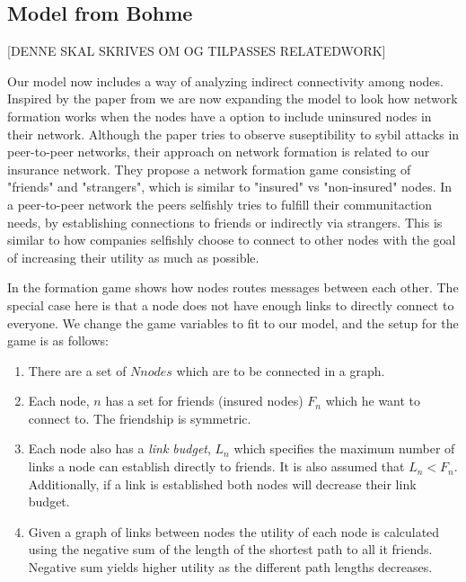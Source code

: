 \subsection{Model from Bohme}
[DENNE SKAL SKRIVES OM OG TILPASSES RELATEDWORK]

Our model now includes a way of analyzing indirect connectivity among nodes. Inspired by the paper from \cite{danezis2006network} we are now expanding the model to look how network formation works when the nodes have a option to include uninsured nodes in their network. Although the paper tries to observe suseptibility to sybil attacks in peer-to-peer networks, their approach on network formation is related to our insurance network. They propose a network formation game consisting of "friends" and "strangers", which is similar to "insured" vs "non-insured" nodes. 
In a peer-to-peer network the peers selfishly tries to fulfill their communitaction needs, by establishing connections to friends or indirectly via strangers. This is similar to how companies selfishly choose to connect to other nodes with the goal of increasing their utility as much as possible. 

In \cite{danezis2006network} the formation game shows how nodes routes messages between each other. The special case here is that a node does not have enough links to directly connect to everyone. We change the game variables to fit to our model, and the setup for the game is as follows:

\begin{enumerate}

\item There are a set of $N nodes$ which are to be connected in a graph.
\item Each node, $n$ has a set for friends (insured nodes) $F_{n}$ which he want to connect to. The friendship is symmetric.
\item Each node also has a \textit{link budget}, $L_{n}$ which specifies the maximum number of links a node can establish directly to friends. It is also assumed that $L_{n}<F_{n}$. Additionally, if a link is established both nodes will decrease their link budget.
\item Given a graph of links between nodes the utility of each node is calculated using the negative sum of the length of the shortest path to all it friends. Negative sum yields higher utility as the different path lengths decreases.
\end{enumerate}


